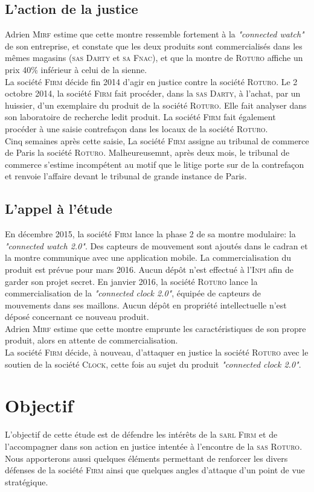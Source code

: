 \subsection{L'action de la justice}
Adrien \textsc{Mirf} estime que cette montre ressemble fortement à la \textit{"connected watch"} de son entreprise, et constate que les deux produits sont commercialisés dans les mêmes magasins (\textsc{sas Darty} et \textsc{sa Fnac}), et que la montre de \textsc{Roturo} affiche un prix 40\% inférieur à celui de la sienne.\\ 
La société \textsc{Firm} décide fin 2014 d'agir en justice contre la société \textsc{Roturo}. Le 2 octobre 2014, la société \textsc{Firm} fait procéder, dans la \textsc{sas Darty}, à l'achat, par un huissier, d'un exemplaire du produit de la société \textsc{Roturo}. Elle fait analyser dans son laboratoire de recherche ledit produit. La société \textsc{Firm} fait également procéder à une saisie contrefaçon dans les locaux de la société \textsc{Roturo}. \\
Cinq semaines après cette saisie, La société \textsc{Firm} assigne au tribunal de commerce de Paris la société \textsc{Roturo}. Malheureusemnt, après deux mois, le tribunal de commerce s'estime incompétent au motif que le litige porte sur de la contrefaçon et renvoie l'affaire devant le tribunal de grande instance de Paris.\\
\subsection{L'appel à l'étude}
En décembre 2015, la société \textsc{Firm} lance la phase 2 de sa montre modulaire: la \textit{"connected watch 2.0"}. Des capteurs de mouvement sont ajoutés dans le cadran et la montre communique avec une application mobile. La commercialisation du produit est prévue pour mars 2016. Aucun dépôt n'est effectué à l'\textsc{Inpi} afin de garder son projet secret.
En janvier 2016, la société \textsc{Roturo} lance la commercialisation de la \textit{"connected clock 2.0"}, équipée de capteurs de mouvements dans ses maillons. Aucun dépôt en propriété intellectuelle n'est déposé concernant ce nouveau produit. \\
Adrien \textsc{Mirf} estime que cette montre emprunte les caractéristiques de son propre produit, alors en attente de commercialisation.\\
La société \textsc{Firm} décide, à nouveau, d'attaquer en justice la société \textsc{Roturo} avec le soutien de la société \textsc{Clock}, cette fois au sujet du produit \textit{"connected clock 2.0"}.
\section{Objectif}
L'objectif de cette étude est de défendre les intérêts de la \textsc{sarl Firm} et de l'accompagner dans son action en justice intentée à l'encontre de la \textsc{sas Roturo}. Nous apporterons aussi quelques éléments permettant de renforcer les divers défenses de la société \textsc{Firm} ainsi que quelques angles d'attaque d'un point de vue stratégique.